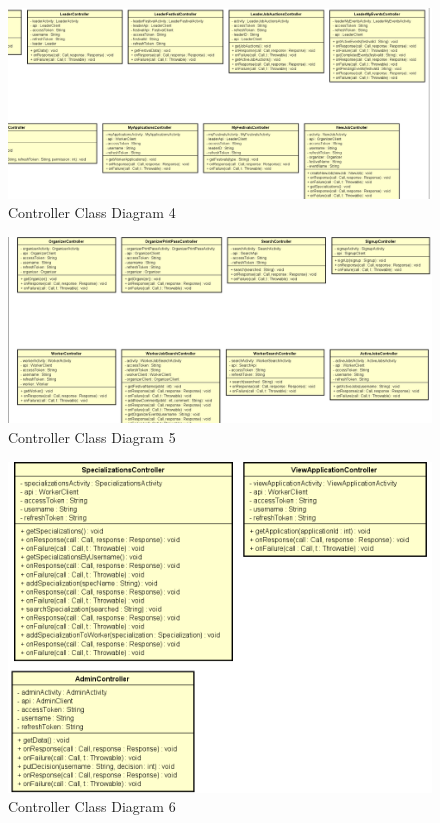 \begin{figure}[H]
	\includegraphics[width=\linewidth]{diagrams/Controllers Class Diagram_part4.png}
	\caption{Controller Class Diagram 4}
	\label{fig:controller_class_diag_pt4}
\end{figure}

\begin{figure}[H]
	\includegraphics[width=\linewidth]{diagrams/Controllers Class Diagram_part5.png}
	\caption{Controller Class Diagram 5}
	\label{fig:controller_class_diag_pt5}
\end{figure}

\begin{figure}[H]
	\includegraphics[width=\linewidth]{diagrams/Controllers Class Diagram_part6.png}
	\caption{Controller Class Diagram 6}
	\label{fig:controller_class_diag_pt6}
\end{figure}

